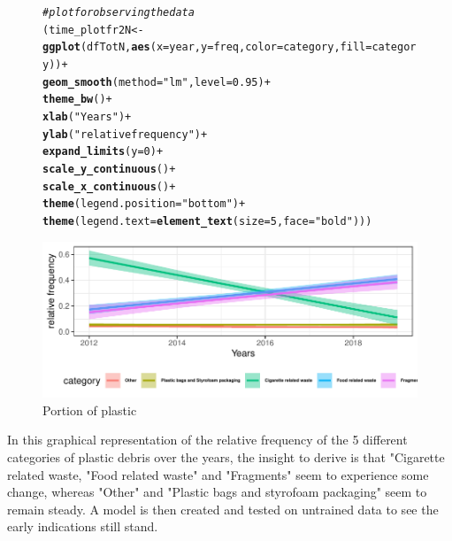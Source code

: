 \documentclass[10pt]{article}\usepackage[]{graphicx}\usepackage[]{color}
\makeatletter
\newcommand{\hlnum}[1]{\textcolor[rgb]{0.686,0.059,0.569}{#1}}%
\newcommand{\hlstr}[1]{\textcolor[rgb]{0.192,0.494,0.8}{#1}}%
\newcommand{\hlcom}[1]{\textcolor[rgb]{0.678,0.584,0.686}{\textit{#1}}}%
\newcommand{\hlopt}[1]{\textcolor[rgb]{0,0,0}{#1}}%
\newcommand{\hlstd}[1]{\textcolor[rgb]{0.345,0.345,0.345}{#1}}%
\newcommand{\hlkwb}[1]{\textcolor[rgb]{0.69,0.353,0.396}{#1}}%
\newcommand{\hlkwc}[1]{\textcolor[rgb]{0.333,0.667,0.333}{#1}}%
\newcommand{\hlkwd}[1]{\textcolor[rgb]{0.737,0.353,0.396}{\textbf{#1}}}%
\newenvironment{kframe}{%
 \def\at@end@of@kframe{}%
 \ifinner\ifhmode%
  \def\at@end@of@kframe{\end{minipage}}%
  \begin{minipage}{\columnwidth}%
 \fi\fi%
 \def\FrameCommand##1{\hskip\@totalleftmargin \hskip-\fboxsep
 \colorbox{shadecolor}{##1}\hskip-\fboxsep
     \hskip-\linewidth \hskip-\@totalleftmargin \hskip\columnwidth}%
 \MakeFramed {\advance\hsize-\width
   \@totalleftmargin\z@ \linewidth\hsize
   \@setminipage}}%
 {\par\unskip\endMakeFramed%
 \at@end@of@kframe}
\newenvironment{knitrout}{}{} %
\makeatother
\begin{document}
\begin{figure}[H] 
\begin{center}
\begin{knitrout}\small
{}\color{fgcolor}\begin{kframe}
\begin{alltt}
\hlcom{# plot for observing the data}
\hlstd{(time_plotfr2N} \hlkwb{<-} \hlkwd{ggplot}\hlstd{(dfTotN,} \hlkwd{aes}\hlstd{(}\hlkwc{x} \hlstd{= year,} \hlkwc{y} \hlstd{= freq,} \hlkwc{color}\hlstd{=category,} \hlkwc{fill} \hlstd{= category))} \hlopt{+}
  \hlkwd{geom_smooth}\hlstd{(}\hlkwc{method}\hlstd{=}\hlstr{"lm"}\hlstd{,} \hlkwc{level}\hlstd{=}\hlnum{0.95}\hlstd{)} \hlopt{+}
  \hlkwd{theme_bw}\hlstd{()} \hlopt{+}
  \hlkwd{xlab}\hlstd{(}\hlstr{"Years"}\hlstd{)} \hlopt{+}
  \hlkwd{ylab}\hlstd{(}\hlstr{"relative frequency"}\hlstd{)} \hlopt{+}
  \hlkwd{expand_limits}\hlstd{(}\hlkwc{y}\hlstd{=}\hlnum{0}\hlstd{)} \hlopt{+}
  \hlkwd{scale_y_continuous}\hlstd{()} \hlopt{+}
  \hlkwd{scale_x_continuous}\hlstd{()}\hlopt{+}
  \hlkwd{theme}\hlstd{(}\hlkwc{legend.position}\hlstd{=}\hlstr{"bottom"}\hlstd{)}\hlopt{+}
  \hlkwd{theme}\hlstd{(}\hlkwc{legend.text} \hlstd{=} \hlkwd{element_text}\hlstd{(}\hlkwc{size}\hlstd{=}\hlnum{5}\hlstd{,} \hlkwc{face}\hlstd{=}\hlstr{"bold"}\hlstd{)))}
\end{alltt}
\end{kframe}
\includegraphics[width=1\linewidth]{figure/unnamed-chunk-28-1} 

\end{knitrout}
\caption {Portion of plastic}
\label{figG1}
\end {center}
\end {figure}


In this graphical representation of the relative frequency of the 5 different categories of plastic debris over the years, the insight to derive is that "Cigarette related waste, "Food related waste" and "Fragments" seem to experience some change, whereas "Other" and "Plastic bags and styrofoam packaging" seem to remain steady. A model is then created and tested on untrained data to see the early indications still stand.
\end{document}
